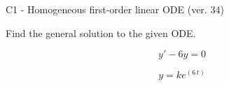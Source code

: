 \begin{exercise}
  \begin{exerciseTitle}C1 - Homogeneous first-order linear ODE (ver. 34)\end{exerciseTitle}
  \begin{exerciseStatement}
    
Find the general solution to the given ODE.

    
\[y'-6y=0\]

  \end{exerciseStatement}
  \begin{exerciseAnswer}
    
\[y= k e^{\left(6 \, t\right)}\]

  \end{exerciseAnswer}
\end{exercise}